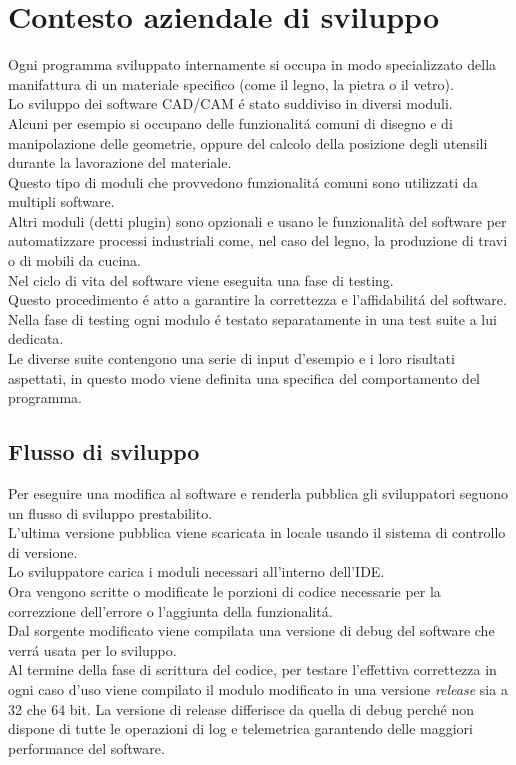 \chapter{Contesto aziendale di sviluppo}
    Ogni programma sviluppato internamente si occupa in modo specializzato della manifattura di un materiale specifico (come il legno, la pietra o il vetro).\\
    Lo sviluppo dei software CAD/CAM \'e stato suddiviso in diversi moduli.\\
    Alcuni per esempio si occupano delle funzionalit\'a comuni di disegno e di manipolazione delle geometrie, oppure del calcolo della posizione degli utensili durante la lavorazione del materiale.\\
    Questo tipo di moduli che provvedono funzionalit\'a comuni sono utilizzati da multipli software.\\
    Altri moduli (detti plugin) sono opzionali e usano le funzionalità del software per automatizzare processi industriali come, nel caso del legno, la produzione di travi o di mobili da cucina.\\
    
    Nel ciclo di vita del software viene eseguita una fase di testing.\\
    Questo procedimento \'e atto a garantire la correttezza e l'affidabilit\'a del software.\\ 
    Nella fase di testing ogni modulo \'e testato separatamente in una test suite a lui dedicata.\\
    Le diverse suite contengono una serie di input d'esempio e i loro risultati aspettati, in questo modo viene definita una specifica del comportamento del programma.\\

    \section{Flusso di sviluppo}
        Per eseguire una modifica al software e renderla pubblica gli sviluppatori seguono un flusso di sviluppo prestabilito.\\
        L'ultima versione pubblica viene scaricata in locale usando il sistema di controllo di versione.\\
        Lo sviluppatore carica i moduli necessari all'interno dell'IDE.\\
        Ora vengono scritte o modificate le porzioni di codice necessarie per la correzzione dell'errore o l'aggiunta della funzionalit\'a.\\
        Dal sorgente modificato viene compilata una versione di debug del software che verr\'a usata per lo sviluppo.\\
        Al termine della fase di scrittura del codice, per testare l'effettiva correttezza in ogni caso d'uso viene compilato il modulo modificato in una versione \textit{release} sia a 32 che 64 bit.
        La versione di release differisce da quella di debug perch\'e non dispone di tutte le operazioni di log e telemetrica garantendo delle maggiori performance del software.\\
        
